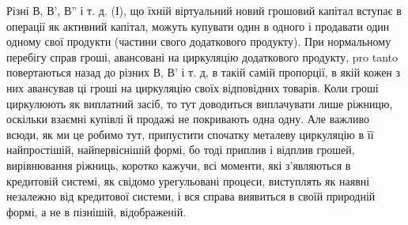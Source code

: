 Різні В, В', В'' і т. д. (І), що їхній віртуальний новий грошовий
капітал вступає в операції як активний капітал, можуть купувати один в одного
і продавати один одному свої продукти (частини свого додаткового
продукту). При нормальному перебігу справ гроші, авансовані на циркуляцію
додаткового продукту, pro tanto повертаються назад до різних
В, В' і т. д, в такій самій пропорції, в якій кожен з них авансував
ці гроші на циркуляцію своїх відповідних товарів. Коли гроші циркулюють
як виплатний засіб, то тут доводиться виплачувати лише ріжницю,
оскільки взаємні купівлі й продажі не покривають одна одну. Але важливо
всюди, як ми це робимо тут, припустити спочатку металеву циркуляцію
в її найпростішій, найпервіснішій формі, бо тоді приплив
і відплив грошей, вирівнювання ріжниць, коротко кажучи, всі моменти,
які з’являються в кредитовій системі, як свідомо урегульовані
процеси, виступлять як наявні незалежно від кредитової системи, і
вся справа виявиться в своїй природній формі, а не в пізнішій,
відображеній.
\parbreak{}  %
